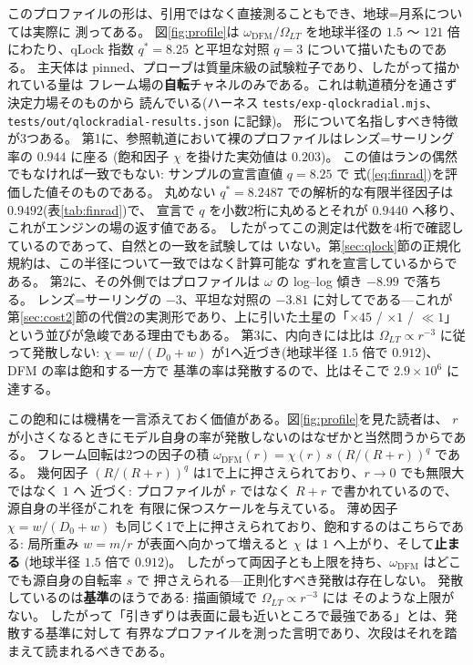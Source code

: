 \documentclass[a4paper,10pt,twocolumn]{ltjsarticle}
\begin{document}
このプロファイルの形は、引用ではなく直接測ることもでき、地球=月系については実際に
測ってある。
図\ref{fig:profile}は $\omega_{\mathrm{DFM}}/\Omega_{LT}$ を地球半径の $1.5$ 〜
$121$ 倍にわたり、qLock 指数 $q^{*}=8.25$ と平坦な対照 $q=3$ について描いたものである。
主天体は pinned、プローブは質量床級の試験粒子であり、したがって描かれている量は
フレーム場の\textbf{自転}チャネルのみである。これは軌道積分を通さず決定力場そのものから
読んでいる(ハーネス \texttt{tests/exp-qlockradial.mjs}、
\texttt{tests/out/qlockradial-results.json} に記録)。
形について名指しすべき特徴が3つある。
第1に、参照軌道において裸のプロファイルはレンズ=サーリング率の $0.944$ に座る
(飽和因子 $\chi$ を掛けた実効値は $0.203$)。
この値はランの偶然でもなければ一致でもない: サンプルの宣言直値 $q=8.25$ で
式(\ref{eq:finrad})を評価した値そのものである。
丸めない $q^{*}=8.2487$ での解析的な有限半径因子は $0.9492$(表\ref{tab:finrad})で、
宣言で $q$ を小数2桁に丸めるとそれが $0.9440$ へ移り、これがエンジンの場の返す値である。
したがってこの測定は代数を4桁で確認しているのであって、自然との一致を試験しては
いない。第\ref{sec:qlock}節の正規化規約は、この半径について一致ではなく計算可能な
ずれを宣言しているからである。
第2に、その外側ではプロファイルは $\omega$ の log--log 傾き $-8.99$ で落ちる。
レンズ=サーリングの $-3$、平坦な対照の $-3.81$ に対してである---これが
第\ref{sec:cost2}節の代償2の実測形であり、上に引いた土星の「$\times45$ / $\times1$ /
$\ll1$」という並びが急峻である理由でもある。
第3に、内向きには比は $\Omega_{LT}\propto r^{-3}$ に従って発散しない:
$\chi=w/(D_0+w)$ が1へ近づき(地球半径 $1.5$ 倍で $0.912$)、DFM の率は飽和する一方で
基準の率は発散するので、比はそこで $2.9\times10^{6}$ に達する。

この飽和には機構を一言添えておく価値がある。図\ref{fig:profile}を見た読者は、
$r$ が小さくなるときにモデル自身の率が発散しないのはなぜかと当然問うからである。
フレーム回転は2つの因子の積
$\omega_{\mathrm{DFM}}(r)=\chi(r)\,s\,(R/(R+r))^{q}$ である。
幾何因子 $(R/(R+r))^{q}$ は1で上に押さえられており、$r\to0$ でも無限大ではなく $1$ へ
近づく: プロファイルが $r$ ではなく $R+r$ で書かれているので、源自身の半径がこれを
有限に保つスケールを与えている。
薄め因子 $\chi=w/(D_0+w)$ も同じく1で上に押さえられており、飽和するのはこちらである:
局所重み $w=m/r$ が表面へ向かって増えると $\chi$ は $1$ へ上がり、そして\textbf{止まる}
(地球半径 $1.5$ 倍で $0.912$)。
したがって両因子とも上限を持ち、$\omega_{\mathrm{DFM}}$ はどこでも源自身の自転率 $s$ で
押さえられる---正則化すべき発散は存在しない。
発散しているのは\textbf{基準}のほうである: 描画領域で $\Omega_{LT}\propto r^{-3}$ には
そのような上限がない。
したがって「引きずりは表面に最も近いところで最強である」とは、発散する基準に対して
有界なプロファイルを測った言明であり、次段はそれを踏まえて読まれるべきである。
\end{document}
